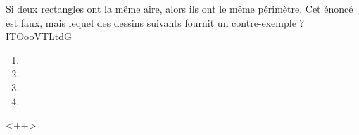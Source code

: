 
\begin{exercice}\label{exosmath-0831}

    Si deux rectangles ont la même aire, alors ils ont le même périmètre. Cet énoncé est faux, mais lequel des dessins suivants fournit un contre-exemple ?
ITOooVTLtdG

\begin{multicols}{2}
    \begin{enumerate}
        \item
   
        \item
   
        \item
   
        \item
   
    \end{enumerate}
\end{multicols}
<++>


\end{exercice}
